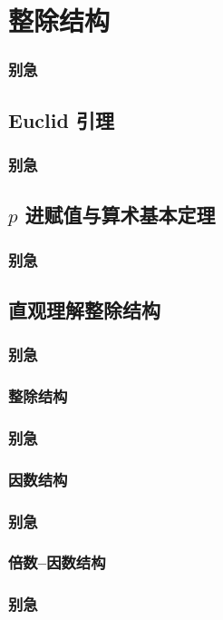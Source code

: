
\section{整除结构}
\begin{frame} %
  \frametitle{别急}
\end{frame}
\subsection{Euclid 引理}
\begin{frame}[c]
  \progressnow*
\end{frame}
\begin{frame} %
  \frametitle{别急}
\end{frame}
\subsection{\texorpdfstring{$p$}{p} 进赋值与算术基本定理}
\begin{frame}[c]
  \progressnow*
\end{frame}
\begin{frame} %
  \frametitle{别急}
\end{frame}
\subsection{直观理解整除结构}
\begin{frame}[c]
  \progressnow*
\end{frame}
\begin{frame} %
  \frametitle{别急}
\end{frame}
\subsubsection{整除结构}
\begin{frame}[c]
  \progressnow
\end{frame}
\begin{frame} %
  \frametitle{别急}
\end{frame}
\subsubsection{因数结构}
\begin{frame}[c]
  \progressnow
\end{frame}
\begin{frame} %
  \frametitle{别急}
\end{frame}
\subsubsection{倍数–因数结构}
\begin{frame}[c]
  \progressnow
\end{frame}
\begin{frame} %
  \frametitle{别急}
\end{frame}
